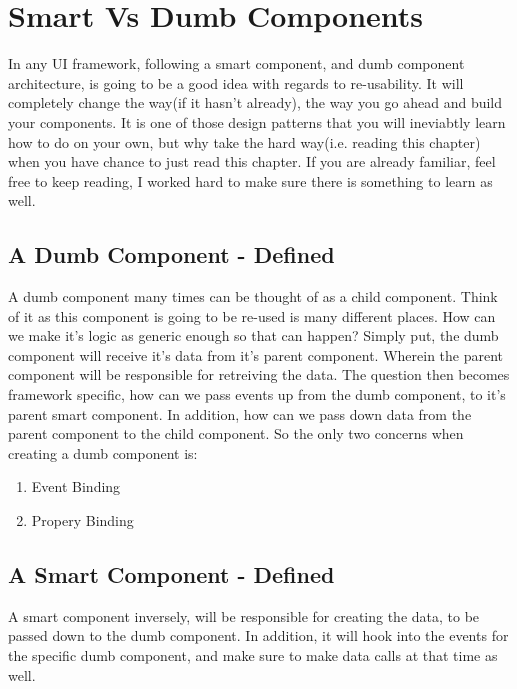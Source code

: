 \maketitle{}
\section{ Smart Vs Dumb Components }

In any UI framework, following a smart component, and dumb component
architecture, is going to be a good idea with regards to re-usability.  It will
completely change the way(if it hasn't already), the way you go ahead and build
your components. It is one of those design patterns that you will ineviabtly
learn how to do on your own, but why take the hard way(i.e. reading this chapter)
when you have chance to just read this chapter. If you are already familiar,
feel free to keep reading, I worked hard to make sure there is something to
learn as well.

\subsection{ A Dumb Component - Defined }
A dumb component many times can be thought of as a child component. Think of it
as this component is going to be re-used is many different places. How can we
make it's logic as generic enough so that can happen? Simply put, the dumb
component will receive it's data from it's parent component. Wherein the parent
component will be responsible for retreiving the data. The question then becomes
framework specific, how can we pass events up from the dumb component, to it's
parent smart component. In addition, how can we pass down data from the parent
component to the child component.
So the only two concerns when creating a dumb component is:
\begin{enumerate}
  \item Event Binding
  \item Propery Binding
\end{enumerate}

\subsection{ A Smart Component - Defined }
A smart component inversely, will be responsible for creating the data, to be
passed down to the dumb component. In addition, it will hook into the events
for the specific dumb component, and make sure to make data calls at that time
as well.

